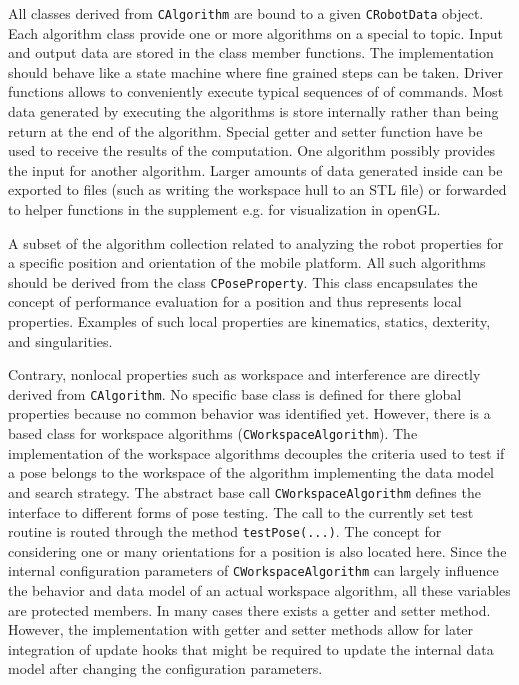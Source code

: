\documentclass[11pt,a4paper,onepage,openany]{book}
\begin{document}
All classes derived from \texttt{CAlgorithm} are bound to a given
\texttt{CRobotData} object. Each algorithm class provide one or more algorithms
on a special to topic. Input and output data are stored in the class member
functions. The implementation should behave like a state machine where fine
grained steps can be taken. Driver functions allows to conveniently execute
typical sequences of of commands. Most data generated by executing the
algorithms is store internally rather than being return at the end of the
algorithm. Special getter and setter function have be used to receive the
results of the computation. One algorithm possibly provides the input for
another algorithm. Larger amounts of data generated inside can be exported to
files (such as writing the workspace hull to an STL file) or forwarded to
helper functions in the supplement e.g. for visualization in openGL.

A subset of the algorithm collection related to analyzing the robot properties
for a specific position and orientation of the mobile platform. All such
algorithms should be derived from the class \texttt{CPoseProperty}. This class
encapsulates the concept of performance evaluation for a position and thus
represents local properties. Examples of such local properties are kinematics,
statics, dexterity, and singularities.

Contrary, nonlocal properties such as workspace and interference are directly
derived from \texttt{CAlgorithm}. No specific base class is defined for there
global properties because no common behavior was identified yet. However, there
is a based class for workspace algorithms (\texttt{CWorkspaceAlgorithm}). The
implementation of the workspace algorithms decouples the criteria used to test
if a pose belongs to the workspace of the algorithm implementing the data model
and search strategy. The abstract base call \texttt{CWorkspaceAlgorithm}
defines the interface to different forms of pose testing. The call to the
currently set test routine is routed through the method \texttt{testPose(...)}.
The concept for considering one or many orientations for a position is also
located here. Since the internal configuration parameters of
\texttt{CWorkspaceAlgorithm} can largely influence the behavior and data model
of an actual workspace algorithm, all these variables are protected members. In
many cases there exists a getter and setter method. However, the implementation
with getter and setter methods allow for later integration of update hooks that
might be required to update the internal data model after changing the
configuration parameters.
\end{document}
